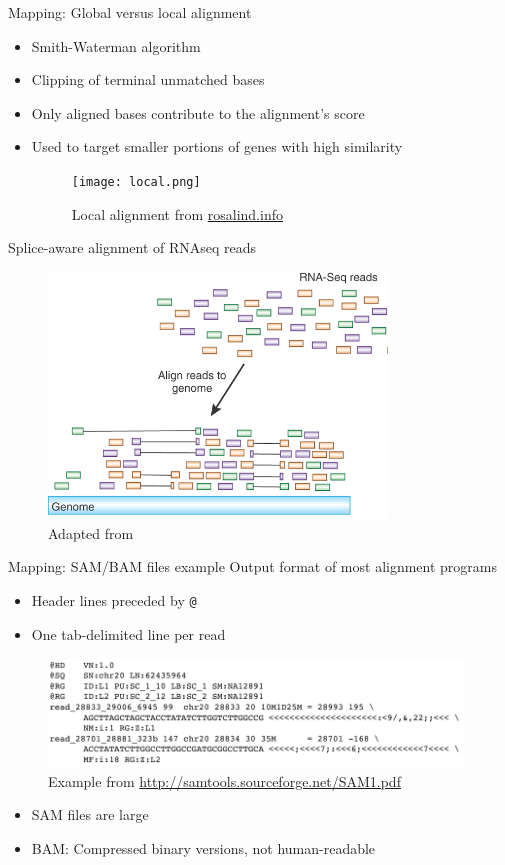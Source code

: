 \documentclass[presentation]{beamer}
\begin{document}
\begin{frame}[label=sec-3-1-6]{Mapping: Global versus local alignment}
\begin{itemize}
\item Smith-Waterman algorithm
\item Clipping of terminal unmatched bases
\item Only aligned bases contribute to the alignment's score
\item Used to target smaller portions of genes with high similarity
\begin{figure}[htb]
\centering
\texttt{[image: local.png]}
\caption{Local alignment from \href{http://rosalind.info/glossary/local-alignment/}{rosalind.info}}
\end{figure}
\end{itemize}
\end{frame}

\begin{frame}[label=sec-3-1-7]{Splice-aware alignment of RNAseq reads}
\begin{figure}[htb]
\centering
\includegraphics[width=9cm]{Haas-2010-NatureBiotechnology.png}
\caption{Adapted from \citet{Haas2010}}
\end{figure}
\end{frame}
\begin{frame}[fragile,label=sec-3-1-8]{Mapping: SAM/BAM files example}
 Output format of most alignment programs 

\begin{itemize}
\item Header lines preceded by \texttt{@}
\item One tab-delimited line per read
\end{itemize}
\begin{figure}[htb]
\centering
\includegraphics[width=11cm]{SAMfile.png}
\caption{Example from  \url{http://samtools.sourceforge.net/SAM1.pdf}}
\end{figure}

\begin{itemize}
\item SAM files are large
\item BAM: Compressed binary versions, not human-readable
\end{itemize}
\end{frame}
\end{document}
